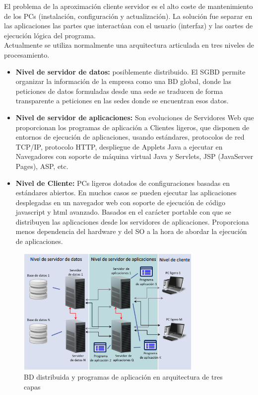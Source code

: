 \documentclass[a4paper,11pt]{article}
\begin{document}
El problema de la aproximación cliente servidor es el alto coste de mantenimiento de los PCs (instalación, configuración y actualización). La solución fue separar en las aplicaciones las partes que interactúan con el usuario (interfaz) y las oartes de ejecución lógica del programa. \\

Actualmente se utiliza normalmente una arquitectura articulada en tres niveles de procesamiento.
\begin{itemize}
\item \textbf{Nivel de servidor de datos:} posiblemente distribuido. El SGBD permite organizar la información de la empresa como una BD global, donde las peticiones de datos formuladas desde una sede se traducen de forma transparente a peticiones en las sedes donde se encuentran esos datos.

\item \textbf{Nivel de servidor de aplicaciones:} Son evoluciones de Servidores Web que proporcionan los programas de aplicación a Clientes ligeros, que disponen de entornos de ejecución de aplicaciones, usando estándares, protocolos de red TCP/IP, protocolo HTTP, despliegue de Applets Java a ejecutar en Navegadores con soporte de máquina virtual Java y Servlets, JSP (JavaServer Pages), ASP, etc.

\item \textbf{Nivel de Cliente:} PCs ligeros dotados de configuraciones basadas en estándares abiertos. En muchos casos se pueden ejecutar las aplicaciones desplegadas en un navegador web con soporte de ejecución de código javascript y html avanzado. Basados en el carácter portable con que se distribuyen las aplicaciones desde los servidores de aplicaciones. Proporciona menos dependencia del hardware y del SO a la hora de abordar la ejecución de aplicaciones.
\end{itemize}

\begin{figure}
\centering
\includegraphics[scale=1,width=0.8\textwidth]{arquitectura_tres_capas.png}
\caption{BD distribuida y programas de aplicación en arquitectura de tres capas}
\end{figure}
\end{document}
